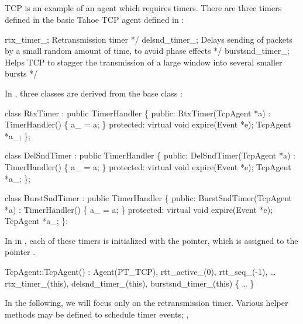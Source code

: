 \subsection{}
TCP is an example of an agent which requires timers.  There are three timers
defined in the basic Tahoe TCP agent defined in :
\begin{program}
        rtx_timer_;      \*  Retransmission timer */
        delsnd_timer_;   \*  Delays sending of packets by a small random amount of time,
                              to avoid phase effects */
        burstsnd_timer_;   \* Helps TCP to stagger the transmission of a large window
                               into several smaller bursts */
\end{program}
In , three classes are derived from the base class
:
\begin{program}
        class RtxTimer : public TimerHandler \{
        public:
            RtxTimer(TcpAgent *a) : TimerHandler() \{ a_ = a; \}
        protected:                   
            virtual void expire(Event *e);
            TcpAgent *a_;
        \};  
            
        class DelSndTimer : public TimerHandler \{
        public:
            DelSndTimer(TcpAgent *a) : TimerHandler() \{ a_ = a; \}
        protected:
            virtual void expire(Event *e);
            TcpAgent *a_;
        \};      
    
        class BurstSndTimer : public TimerHandler \{
        public: 
            BurstSndTimer(TcpAgent *a) : TimerHandler() \{ a_ = a; \}
        protected:
            virtual void expire(Event *e); 
            TcpAgent *a_;
        \};  
\end{program}
In
in ,
each of these timers
is initialized with the  pointer,
which is assigned to the pointer .
\begin{program}
        TcpAgent::TcpAgent() : Agent(PT_TCP), rtt_active_(0), rtt_seq_(-1), 
            \ldots
            rtx_timer_(this), delsnd_timer_(this), burstsnd_timer_(this)
        \{
            \ldots
        \}
\end{program}
In the following, we will focus only on the retransmission timer.  Various
helper methods may be defined to schedule timer events; \eg,
